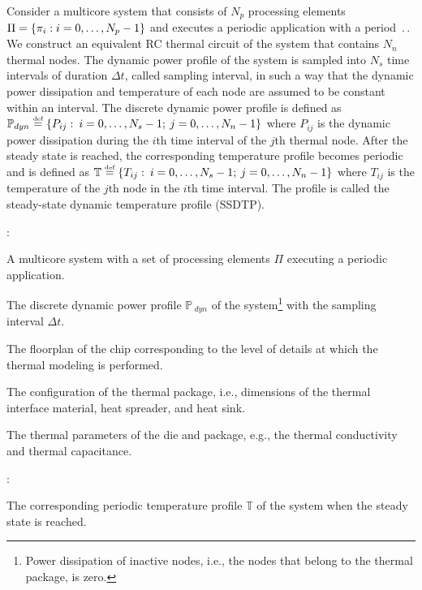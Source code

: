 Consider a multicore system that consists of $N_p$ processing elements $\Pi = \{ \pi_i: i = 0, \dots, N_p - 1 \}$ and executes a periodic application with a period $\period$. We construct an equivalent RC thermal circuit of the system that contains $N_n$ thermal nodes. The dynamic power profile of the system is sampled into $N_s$ time intervals of duration $\Delta t$, called sampling interval, in such a way that the dynamic power dissipation and temperature of each node are assumed to be constant within an interval. The discrete dynamic power profile is defined as $\mathbb{P}_{dyn} \eqdef \{ P_{ij}: \: i = \range{0}{N_s - 1}; \: j = \range{0}{N_n - 1} \}$ where $P_{ij}$ is the dynamic power dissipation during the $i$th time interval of the $j$th thermal node. After the steady state is reached, the corresponding temperature profile becomes periodic and is defined as $\mathbb{T} \eqdef \{ T_{ij}: \: i = \range{0 }{N_s - 1}; \: j = \range{0}{N_n - 1} \}$ where $T_{ij}$ is the temperature of the $j$th node in the $i$th time interval. The profile is called the steady-state dynamic temperature profile (SSDTP).

:
\begin{ilist}
  \item A multicore system with a set of processing elements $\Pi$ executing a periodic application.
  \item The discrete dynamic power profile $\mathbb{P}_{\:dyn}$ of the system\footnote{Power dissipation of inactive nodes, i.e., the nodes that belong to the thermal package, is zero.} with the sampling interval $\Delta t$.
  \item The floorplan of the chip corresponding to the level of details at which the thermal modeling is performed.
  \item The configuration of the thermal package, i.e., dimensions of the thermal interface material, heat spreader, and heat sink.
  \item The thermal parameters of the die and package, e.g., the thermal conductivity and thermal capacitance.
\end{ilist}

:
\begin{ilist}
  \item The corresponding periodic temperature profile $\mathbb{T}$ of the system when the steady state is reached.
\end{ilist}
